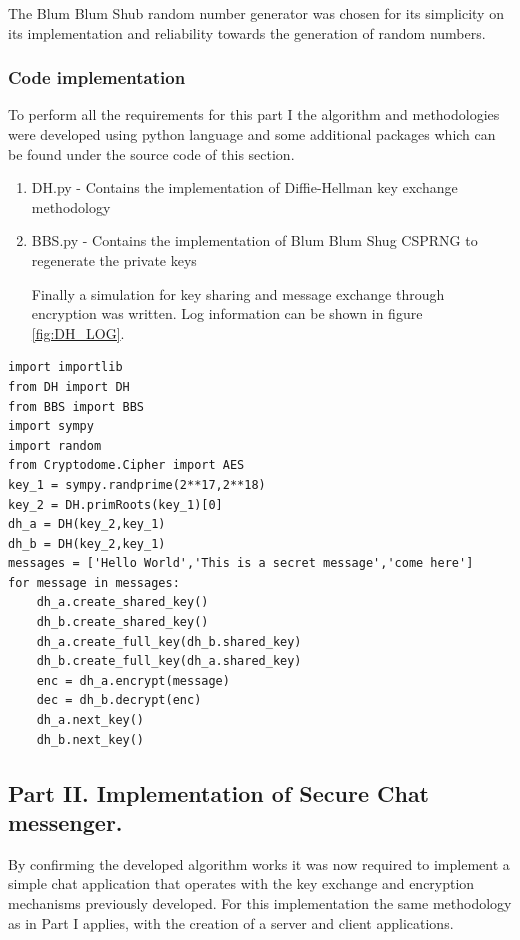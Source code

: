\documentclass[letterpaper,12pt]{article}
\begin{document}
The Blum Blum Shub random number generator was chosen for its simplicity on its implementation and reliability towards the generation of random numbers.

\subsubsection{Code implementation}
To perform all the requirements for this part I the algorithm and methodologies were developed using python language and some additional packages which can be found under the source code of this section.
\begin{enumerate}
    \item DH.py - Contains the implementation of Diffie-Hellman key exchange methodology
    \item BBS.py - Contains the implementation of Blum Blum Shug CSPRNG to regenerate the private keys
    
Finally a simulation for key sharing and message exchange through encryption was written. Log information can be shown in figure \ref{fig:DH_LOG}.
\end{enumerate}
\hline
\begin{lstlisting}
import importlib
from DH import DH
from BBS import BBS
import sympy
import random
from Cryptodome.Cipher import AES
key_1 = sympy.randprime(2**17,2**18)
key_2 = DH.primRoots(key_1)[0]
dh_a = DH(key_2,key_1)
dh_b = DH(key_2,key_1)
messages = ['Hello World','This is a secret message','come here']
for message in messages:
    dh_a.create_shared_key()
    dh_b.create_shared_key()
    dh_a.create_full_key(dh_b.shared_key)
    dh_b.create_full_key(dh_a.shared_key)
    enc = dh_a.encrypt(message)
    dec = dh_b.decrypt(enc)
    dh_a.next_key()
    dh_b.next_key()
\end{lstlisting}
\hline


\subsection{Part II. Implementation of Secure Chat messenger.}
By confirming the developed algorithm works it was now required to implement a simple chat application that operates with the key exchange and encryption mechanisms previously developed.
For this implementation the same methodology as in Part I applies, with the creation of a server and client applications.
\end{document}
